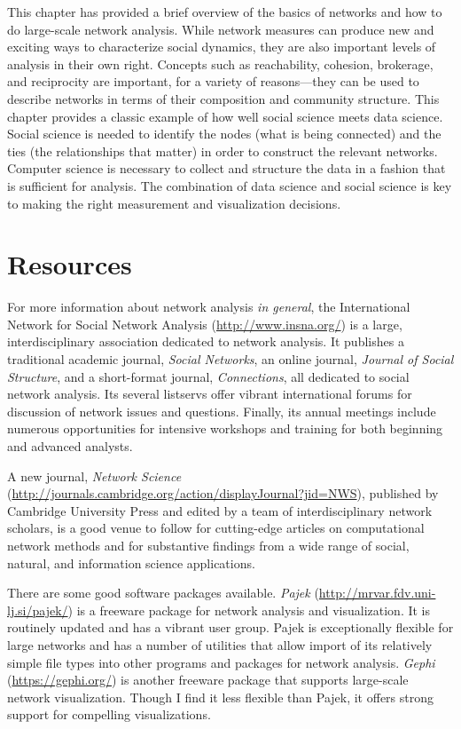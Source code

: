 \documentclass[]{krantz}
\begin{document}
This chapter has provided a brief overview of the basics of networks and
how to do large-scale network analysis. While network measures can
produce new and exciting ways to characterize social dynamics, they are
also important levels of analysis in their own right. Concepts such as
reachability, cohesion, brokerage, and reciprocity are important, for a
variety of reasons---they can be used to describe networks in terms of
their composition and community structure. This chapter provides a
classic example of how well social science meets data science. Social
science is needed to identify the nodes (what is being connected) and
the ties (the relationships that matter) in order to construct the
relevant networks. Computer science is necessary to collect and
structure the data in a fashion that is sufficient for analysis. The
combination of data science and social science is key to making the
right measurement and visualization decisions.

\section{Resources}\label{resources-4}

For more information about network analysis \emph{in general}, the
International Network for Social Network Analysis
(\url{http://www.insna.org/}) is a large, interdisciplinary association
dedicated to network analysis. It publishes a traditional academic
journal, \emph{Social Networks}, an online journal, \emph{Journal of
Social Structure}, and a short-format journal, \emph{Connections}, all
dedicated to social network analysis. Its several listservs offer
vibrant international forums for discussion of network issues and
questions. Finally, its annual meetings include numerous opportunities
for intensive workshops and training for both beginning and advanced
analysts.

A new journal, \emph{Network Science}
(\url{http://journals.cambridge.org/action/displayJournal?jid=NWS}),
published by Cambridge University Press and edited by a team of
interdisciplinary network scholars, is a good venue to follow for
cutting-edge articles on computational network methods and for
substantive findings from a wide range of social, natural, and
information science applications.

There are some good software packages available. \emph{Pajek}
(\url{http://mrvar.fdv.uni-lj.si/pajek/}) is a freeware package for
network analysis and visualization. It is routinely updated and has a
vibrant user group. Pajek is exceptionally flexible for large networks
and has a number of utilities that allow import of its relatively simple
file types into other programs and packages for network analysis.
\emph{Gephi} (\url{https://gephi.org/}) is another freeware package that
supports large-scale network visualization. Though I find it less
flexible than Pajek, it offers strong support for compelling
visualizations.
\end{document}

